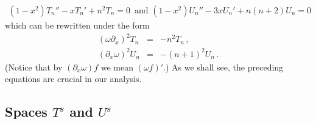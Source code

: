 \documentclass[a4paper]{article}
\begin{document}
\begin{eqnarray*}
	(1-x^2)T_n'' -xT_n' +n^2T_n =0\,\mbox{ and }(1-x^2)U_n'' -3xU_n' +n(n+2)U_n =0
\end{eqnarray*}
which can be rewritten under the form
\begin{eqnarray}
	(\omega\partial_x)^2 T_n &=& -n^2T_n\,, \label{cheb1}\\
	(\partial_x\omega)^2 U_n &=& -(n+1)^2U_n\, .\label{cheb2}
\end{eqnarray}
(Notice that by $(\partial_x\omega) f$ we mean $(\omega f)'$.)
As we shall see, the preceding equations are crucial in our analysis. 

\subsection{Spaces $T^s$ and $U^s$}
\end{document}
